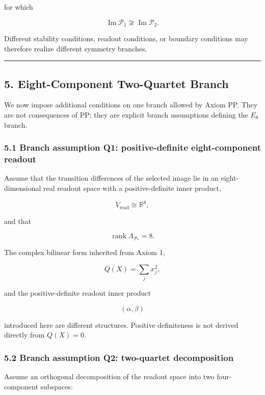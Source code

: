 \documentclass[
  a4paper,
]{article}
\begin{document}
for which

\[
\operatorname{Im}\mathcal P_1
\not\cong
\operatorname{Im}\mathcal P_2.
\]

Different stability conditions, readout conditions, or boundary
conditions may therefore realize different symmetry branches.

\begin{center}\rule{0.5\linewidth}{0.5pt}\end{center}

\subsection{5. Eight-Component Two-Quartet
Branch}\label{eight-component-two-quartet-branch}

We now impose additional conditions on one branch allowed by Axiom PP.
They are not consequences of PP; they are explicit branch assumptions
defining the \(E_8\) branch.

\subsubsection{5.1 Branch assumption Q1: positive-definite
eight-component
readout}\label{branch-assumption-q1-positive-definite-eight-component-readout}

Assume that the transition differences of the selected image lie in an
eight-dimensional real readout space with a positive-definite inner
product,

\[
V_{\mathrm{read}}
\cong
\mathbb R^8,
\]

and that

\[
\operatorname{rank}
\Lambda_{\mathcal P_*}
=8.
\]

The complex bilinear form inherited from Axiom 1,

\[
Q(X)=\sum_jx_j^2,
\]

and the positive-definite readout inner product

\[
(\alpha,\beta)
\]

introduced here are different structures. Positive definiteness is not
derived directly from \(Q(X)=0\).

\subsubsection{5.2 Branch assumption Q2: two-quartet
decomposition}\label{branch-assumption-q2-two-quartet-decomposition}

Assume an orthogonal decomposition of the readout space into two
four-component subspaces:
\end{document}
